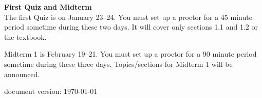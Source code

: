 \documentclass[12pt]{article}
\renewcommand{\emph}[1]{\textsf{\textbf{#1}}}
\newcommand{\localhead}[1]{\par\smallskip\textbf{#1}\nobreak\\}%
\def\heading#1{\localhead{\large\emph{#1}}}
\begin{document}
\heading{First Quiz and Midterm}  The first Quiz is on January 23--24.  You must set up a proctor for a 45 minute period sometime during these two days.  It will cover only sections 1.1 and 1.2 or the textbook.

Midterm 1 is February 19--21.  You must set up a proctor for a 90 minute period sometime during these three days.  Topics/sections for Midterm 1 will be announced.

\vfill
\hfill \scriptsize document version: \today \normalsize
\end{document}
